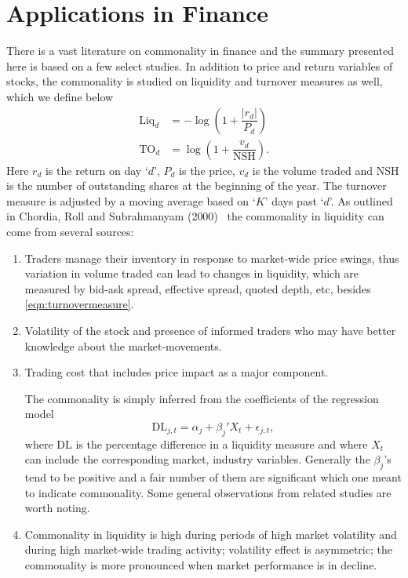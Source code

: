 \section{Applications in Finance}

There is a vast literature on commonality in finance and the summary presented here is based on a few select studies. In addition to price and return variables of stocks, the commonality is studied on liquidity and turnover measures as well, which we define below
	\begin{equation} \label{eqn:turnovermeasure}
	\begin{split}
	\text{Liq}_d&= - \log \left( 1 + \dfrac{|r_d|}{P_d} \right) \\
	\text{TO}_d&= \log \left( 1 + \dfrac{v_d}{\text{NSH}} \right).
	\end{split}
	\end{equation}
Here $r_d$ is the return on day `$d$', $P_d$ is the price, $v_d$ is the volume traded and NSH is the number of outstanding shares at the beginning of the year. The turnover measure is adjusted by a moving average based on `$K$' days past `$d$'. As outlined in Chordia, Roll and Subrahmanyam (2000)~\cite{chordia} the commonality in liquidity can come from several sources: 
	\begin{enumerate}[--]
	\item Traders manage their inventory in response to market-wide price swings, thus variation in volume traded can lead to changes in liquidity, which are measured by bid-ask spread, effective spread, quoted depth, etc, besides \eqref{eqn:turnovermeasure}.
	\item Volatility of the stock and presence of informed traders who may have better knowledge about the market-movements. 
	\item Trading cost that includes price impact as a major component. 
	
	The commonality is simply inferred from the coefficients of the regression model
		\begin{equation} \label{eqn:coefficreg}
		\text{DL}_{j,t}= \alpha_j + \beta_j' X_t + \epsilon_{j,t},
		\end{equation}
	where $\text{DL}$ is the percentage difference in a liquidity measure and where $X_t$ can include the corresponding market, industry variables. Generally the $\beta_j$'s tend to be positive and a fair number of them are significant which one meant to indicate commonality. Some general observations from related studies are worth noting. 
	\item Commonality in liquidity is high during periods of high market volatility and during high market-wide trading activity; volatility effect is asymmetric; the commonality is more pronounced when market performance is in decline. 
	\end{enumerate}


